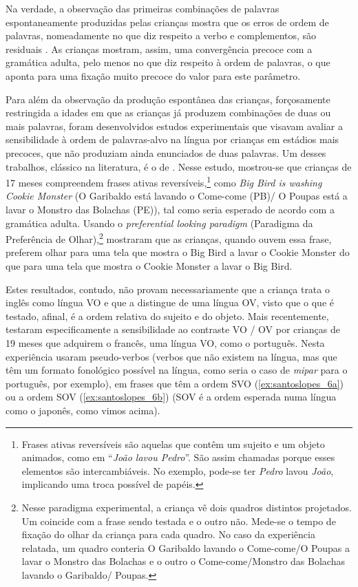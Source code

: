 \documentclass[output=paper]{LSP/langsci}
\begin{document}
Na verdade, a observação das primeiras combinações de palavras espontaneamente produzidas pelas crianças mostra que os erros de ordem de palavras, nomeadamente no que diz respeito a verbo e complementos, são residuais \citep{bloom1970,brown1973}. As crianças mostram, assim, uma convergência precoce com a gramática adulta, pelo menos no que diz respeito à ordem de palavras, o que aponta para uma fixação muito precoce do valor para este parâmetro.

Para além da observação da produção espontânea das crianças, forçosamente restringida a idades em que as crianças já produzem combinações de duas ou mais palavras, foram desenvolvidos estudos experimentais que visavam avaliar a sensibilidade à ordem de palavras-alvo na língua por crianças em estádios mais precoces, que não produziam ainda enunciados de duas palavras. Um desses trabalhos, clássico na literatura, é o de \citet{hirshpasekgolinkoff1996}. Nesse estudo, mostrou-se que crianças de 17 meses compreendem frases ativas reversíveis,\footnote{Frases ativas reversíveis são aquelas que contêm um sujeito e um objeto animados, como em “\textit{João lavou Pedro}”. São assim chamadas porque esses elementos são intercambiáveis. No exemplo, pode-se ter \textit{Pedro} lavou \textit{João}, implicando uma troca possível de papéis.} como \textit{Big Bird is washing Cookie Monster} (O Garibaldo está lavando o Come-come (PB)/ O Poupas está a lavar o Monstro das Bolachas (PE)), tal como seria esperado de acordo com a gramática adulta. Usando o \textit{preferential looking paradigm} (Paradigma da Preferência de Olhar),\footnote{Nesse paradigma experimental, a criança vê dois quadros distintos projetados. Um coincide com a frase sendo testada e o outro não. Mede-se o tempo de fixação do olhar da criança para cada quadro. No caso da experiência relatada, um quadro conteria O Garibaldo lavando o Come-come/O Poupas a lavar o Monstro das Bolachas e o outro o Come-come/Monstro das Bolachas lavando o Garibaldo/ Poupas.} mostraram que as crianças, quando ouvem essa frase, preferem olhar para uma tela que mostra o Big Bird a lavar o Cookie Monster do que para uma tela que mostra o Cookie Monster a lavar o Big Bird. 

Estes resultados, contudo, não provam necessariamente que a criança trata o inglês como língua VO e que a distingue de uma língua OV, visto que o que é testado, afinal, é a ordem relativa do sujeito e do objeto. Mais recentemente, \citet{franck_etal2013} testaram especificamente a sensibilidade ao contraste VO / OV por crianças de 19 meses que adquirem o francês, uma língua VO, como o português. Nesta experiência usaram pseudo-verbos (verbos que não existem na língua, mas que têm um formato fonológico possível na língua, como seria o caso de \textit{mipar} para o português, por exemplo), em frases que têm a ordem SVO
(\ref{ex:santoslopes_6a}) ou a ordem SOV (\ref{ex:santoslopes_6b}) (SOV é a ordem esperada numa língua como o japonês, como vimos acima).
\end{document}
